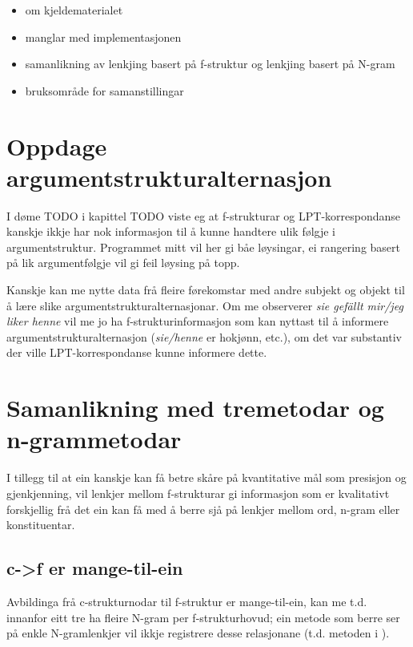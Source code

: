 \documentclass[11pt,a4paper,oneside,draft]{book}
\begin{document}
\label{SEC:diskusjon}

\begin{itemize}
\item om kjeldematerialet
\item manglar med implementasjonen
\item samanlikning av lenkjing basert på f-struktur og lenkjing basert
     på N-gram
\item bruksområde for samanstillingar
\end{itemize}
\section{Oppdage argumentstrukturalternasjon}
\label{sec-5.1}

 I døme TODO i kapittel TODO viste eg at f-strukturar og
LPT-korrespondanse kanskje ikkje har nok informasjon til å kunne
handtere ulik følgje i argumentstruktur. Programmet mitt vil her gi
båe løysingar, ei rangering basert på lik argumentfølgje vil gi feil
løysing på topp.

Kanskje kan me nytte data frå fleire førekomstar med andre subjekt og
objekt til å lære slike argumentstrukturalternasjonar.  Om me
observerer \emph{sie gefällt mir/jeg liker henne} vil me jo ha
f-strukturinformasjon som kan nyttast til å informere
argumentstrukturalternasjon (\emph{sie/henne} er hokjønn, etc.), om det var
substantiv der ville LPT-korrespondanse kunne informere dette.
\section{Samanlikning med tremetodar og n-grammetodar}
\label{sec-5.2}

I tillegg til at ein kanskje kan få betre skåre på kvantitative mål
som presisjon og gjenkjenning, vil lenkjer mellom f-strukturar gi
informasjon som er kvalitativt forskjellig frå det ein kan få med å
berre sjå på lenkjer mellom ord, n-gram eller konstituentar.

\subsection{c->f er mange-til-ein}
\label{sec-5.2.1}

Avbildinga frå c-strukturnodar til f-struktur er mange-til-ein, kan me
t.d. innanfor eitt tre ha fleire N-gram per f-strukturhovud; ein
metode som berre ser på enkle N-gramlenkjer vil ikkje registrere desse
relasjonane (t.d. metoden i \citet{samuelsson2007apa}).
 
\end{document}
